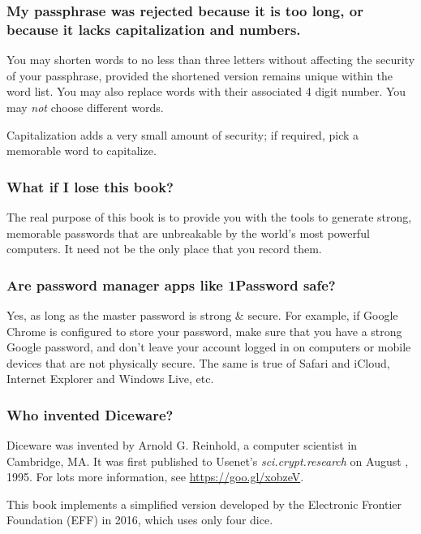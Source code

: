 \subsubsection{My passphrase was rejected because it is too long, or because it lacks capitalization and numbers.}

You may shorten words to no less than three letters without affecting the security of your passphrase, provided the shortened version remains unique within the word list. You may also replace words with their associated 4 digit number. You may \textit{not} choose different words.

Capitalization adds a very small amount of security; if required, pick a memorable word to capitalize.

\subsubsection{What if I lose this book?}

The real purpose of this book is to provide you with the tools to generate strong, memorable passwords that are unbreakable by the world's most powerful computers. It need not be the only place that you record them.

\subsubsection{Are password manager apps like 1Password safe?}

Yes, as long as the master password is strong \& secure. For example, if Google Chrome is configured to store your password, make sure that you have a strong Google password, and don't leave your account logged in on computers or mobile devices that are not physically secure. The same is true of Safari and iCloud, Internet Explorer and Windows Live, etc.

\subsubsection{Who invented Diceware?}

Diceware was invented by Arnold G. Reinhold, a computer scientist in Cambridge, MA. It was first published to Usenet's \textit{sci.crypt.research} on August , 1995. For lots more information, see 
\url{https://goo.gl/xobzeV}.

This book implements a simplified version developed by the Electronic Frontier Foundation (EFF) in 2016, which uses only four dice.
 
